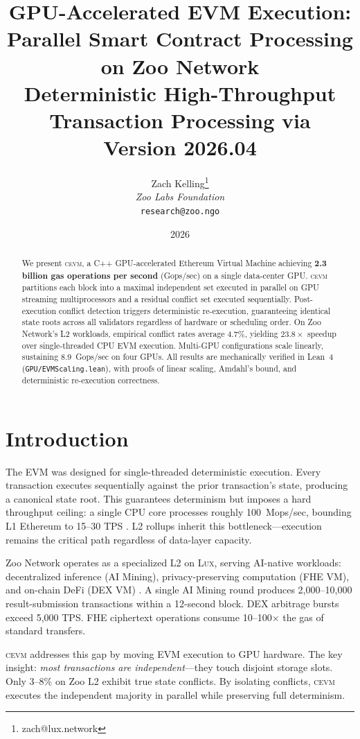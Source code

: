 \documentclass[11pt,letterpaper]{article}
\title{\textbf{GPU-Accelerated EVM Execution: Parallel Smart Contract Processing on Zoo Network}\\
\large Deterministic High-Throughput Transaction Processing via \cevm{}\\
\vspace{5pt}
\normalsize Version 2026.04}
\author{
Zach Kelling\thanks{zach@lux.network}\\
\textit{Zoo Labs Foundation}\\
\texttt{research@zoo.ngo}
}
\date{2026}
\theoremstyle{definition}
\theoremstyle{remark}
\newcommand{\cevm}{\textsc{cevm}}
\newcommand{\Lux}{\textsc{Lux}}
\begin{document}
\zoocoverpage

\begin{abstract}
We present \cevm{}, a C++ GPU-accelerated Ethereum Virtual Machine achieving \textbf{2.3 billion gas operations per second} (Gops/sec) on a single data-center GPU.
\cevm{} partitions each block into a maximal independent set executed in parallel on GPU streaming multiprocessors and a residual conflict set executed sequentially.
Post-execution conflict detection triggers deterministic re-execution, guaranteeing identical state roots across all validators regardless of hardware or scheduling order.
On Zoo Network's L2 workloads, empirical conflict rates average 4.7\%, yielding $23.8\times$ speedup over single-threaded CPU EVM execution.
Multi-GPU configurations scale linearly, sustaining 8.9~Gops/sec on four GPUs.
All results are mechanically verified in Lean~4 (\texttt{GPU/EVMScaling.lean}), with proofs of linear scaling, Amdahl's bound, and deterministic re-execution correctness.
\end{abstract}

\tableofcontents
\newpage

\section{Introduction}
\label{sec:intro}

The EVM was designed for single-threaded deterministic execution.
Every transaction executes sequentially against the prior transaction's state, producing a canonical state root.
This guarantees determinism but imposes a hard throughput ceiling: a single CPU core processes roughly 100~Mops/sec, bounding L1 Ethereum to 15--30 TPS \cite{wood2014ethereum}.
L2 rollups inherit this bottleneck---execution remains the critical path regardless of data-layer capacity.

Zoo Network operates as a specialized L2 on \Lux{}, serving AI-native workloads: decentralized inference (AI Mining), privacy-preserving computation (FHE VM), and on-chain DeFi (DEX VM) \cite{zoo-network-architecture}.
A single AI Mining round produces 2,000--10,000 result-submission transactions within a 12-second block.
DEX arbitrage bursts exceed 5,000 TPS.
FHE ciphertext operations consume 10--100$\times$ the gas of standard transfers.

\cevm{} addresses this gap by moving EVM execution to GPU hardware.
The key insight: \emph{most transactions are independent}---they touch disjoint storage slots.
Only 3--8\% on Zoo L2 exhibit true state conflicts.
By isolating conflicts, \cevm{} executes the independent majority in parallel while preserving full determinism.
\end{document}
